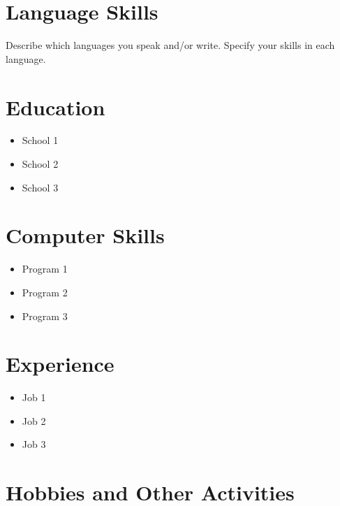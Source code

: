 \section*{Language Skills}
Describe which languages you speak and/or write. Specify your skills in each language.

\section*{Education}
\begin{itemize}
\item School 1
\item School 2
\item School 3
\end{itemize}

\section*{Computer Skills}
\begin{itemize}
\item Program 1
\item Program 2
\item Program 3
\end{itemize}

\section*{Experience}
\begin{itemize}
\item Job 1
\item Job 2
\item Job 3
\end{itemize}

\section*{Hobbies and Other Activities}